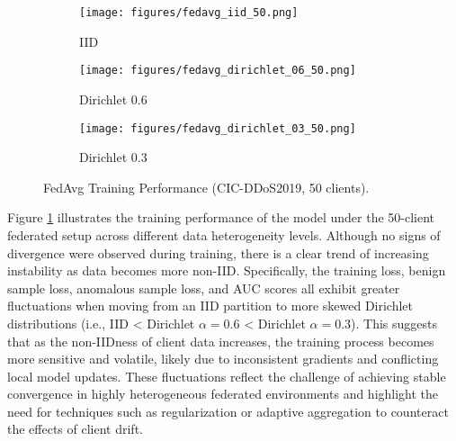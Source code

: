 \begin{figure}[h]
    \centering

    \begin{subfigure}[b]{0.32\textwidth}
        \centering
        \texttt{[image: figures/fedavg\_iid\_50.png]}
        \caption{IID}
    \end{subfigure}
    \hfill
    \begin{subfigure}[b]{0.32\textwidth}
        \centering
        \texttt{[image: figures/fedavg\_dirichlet\_06\_50.png]}
        \caption{Dirichlet 0.6}
    \end{subfigure}
    \hfill
    \begin{subfigure}[b]{0.32\textwidth}
        \centering
        \texttt{[image: figures/fedavg\_dirichlet\_03\_50.png]}
        \caption{Dirichlet 0.3}
    \end{subfigure}

    \caption{FedAvg Training Performance (CIC-DDoS2019, 50 clients).}
    \label{fig:fedavg_performance}
\end{figure}

Figure \ref{fig:fedavg_performance} illustrates the training performance of the model under the 50-client federated setup across different data heterogeneity levels. Although no signs of divergence were observed during training, there is a clear trend of increasing instability as data becomes more non-IID. Specifically, the training loss, benign sample loss, anomalous sample loss, and AUC scores all exhibit greater fluctuations when moving from an IID partition to more skewed Dirichlet distributions (i.e., IID < Dirichlet $\alpha=0.6$ < Dirichlet $\alpha=0.3$). This suggests that as the non-IIDness of client data increases, the training process becomes more sensitive and volatile, likely due to inconsistent gradients and conflicting local model updates. These fluctuations reflect the challenge of achieving stable convergence in highly heterogeneous federated environments and highlight the need for techniques such as regularization or adaptive aggregation to counteract the effects of client drift.

